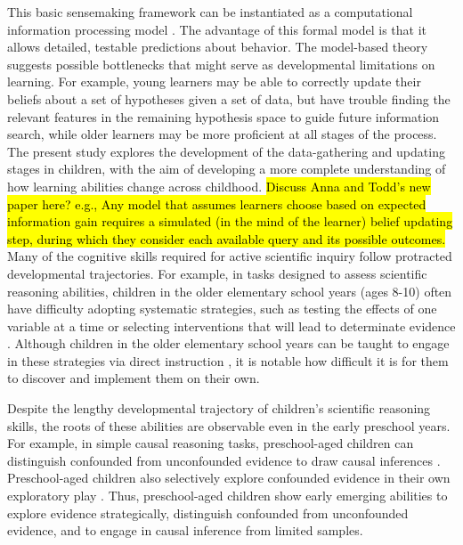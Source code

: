 \documentclass[man,floatsintext]{apa6}
\begin{document}
This basic sensemaking framework can be instantiated as a computational 
information processing model \cite{Gureckis:2012,Gureckis:2009,Markant:2012}. 
The advantage of this formal model is that it allows detailed, testable predictions about behavior. 
The model-based theory suggests possible bottlenecks that might 
serve as developmental limitations on learning. For example, young learners may be 
able to correctly update their beliefs about a set of hypotheses given a set of data, 
but have trouble finding the relevant features in the remaining hypothesis space to guide future information 
search, while older learners may be more proficient at all stages of the process. 
The present study explores the development of the data-gathering and updating 
stages in children, with the aim of developing a more complete understanding of how 
learning abilities change across childhood.
\hl{Discuss Anna and Todd's new paper here? e.g.,
Any model that assumes learners choose based on expected information gain requires a simulated (in the mind of the learner) belief updating step, during which they consider each available query and its possible outcomes.}
Many of the cognitive skills required for active scientific inquiry follow protracted 
developmental trajectories. For example, in tasks designed to assess scientific 
reasoning abilities, children in the older elementary school years (ages 8-10) often 
have difficulty adopting systematic strategies, such as testing the effects of one 
variable at a time or selecting interventions that will lead to determinate evidence 
\cite{Chen:1999}. Although children in the older elementary school years can be 
taught to engage in these strategies via direct instruction \cite{Klahr:2004,Kuhn:2005}, 
it is notable how difficult it is for them to discover and implement them on their own. 

Despite the lengthy developmental trajectory of children's scientific reasoning 
skills, the roots of these abilities are observable even in the early preschool years. 
For example, in simple causal reasoning tasks, preschool-aged children can 
distinguish confounded from unconfounded evidence to draw causal inferences 
\cite{Gopnik:2001,Kushnir:2005,Kushnir:2007,Schulz:2004}. Preschool-aged 
children also selectively explore confounded evidence in their own exploratory play 
\cite{Cook:2011,Gweon:2008,Schulz:2007}. Thus, preschool-aged children show 
early emerging abilities to explore evidence strategically, distinguish confounded 
from unconfounded evidence, and to engage in causal inference from limited samples.
\end{document}
